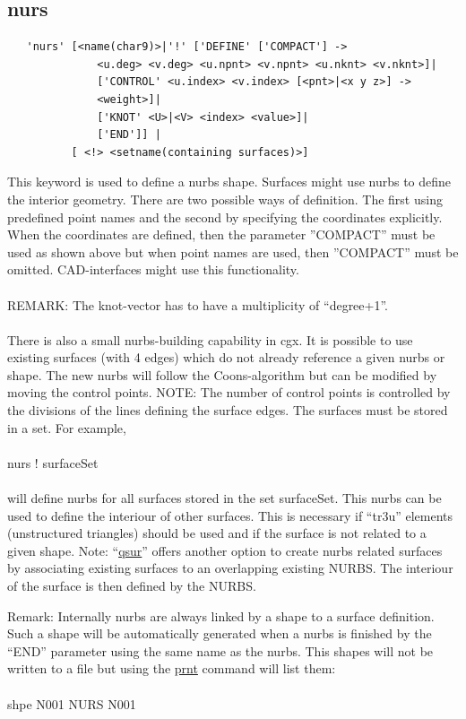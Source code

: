 \documentclass{article}
\providecommand{\htmlref}[2]{\hyperref[#2]{#1}}
\begin{document}
\subsection{\label{nurs}nurs}
\begin{verbatim}
   'nurs' [<name(char9)>|'!' ['DEFINE' ['COMPACT'] ->
              <u.deg> <v.deg> <u.npnt> <v.npnt> <u.nknt> <v.nknt>]|
              ['CONTROL' <u.index> <v.index> [<pnt>|<x y z>] ->
              <weight>]|
              ['KNOT' <U>|<V> <index> <value>]|
              ['END']] |
          [ <!> <setname(containing surfaces)>]
\end{verbatim}
This keyword is used to define a nurbs shape. Surfaces might use nurbs to define the interior geometry. There are two possible ways of definition. The first using predefined point names and the second by specifying the coordinates explicitly. When the coordinates are defined, then the parameter ''COMPACT'' must be used as shown above but when point names are used, then ''COMPACT'' must be omitted. CAD-interfaces might use this functionality.\\\\REMARK: The knot-vector has to have a multiplicity of ``degree+1''.\\\\
There is also a small nurbs-building capability in cgx. It is possible to use
existing surfaces (with 4 edges) which do not already reference a given
nurbs or shape. The new nurbs will follow the Coons-algorithm but can be modified by
moving the control points. NOTE: The number of control points is controlled by the
divisions of the lines defining the surface edges. The surfaces must be stored in a set. For
example,\\\\nurs ! surfaceSet\\\\will define nurbs for all surfaces stored in
the set surfaceSet. This nurbs can be used to define the interiour of other
surfaces. This is necessary if ``tr3u'' elements (unstructured triangles)
should be used and if the surface is not related to a given shape. Note:
``\htmlref{qsur}{qsur}'' offers another option to create nurbs related
surfaces by associating existing surfaces to an overlapping existing
NURBS. The interiour of the surface is then defined by the NURBS.

Remark: Internally nurbs are always linked by a shape to a surface definition. Such a shape will be automatically generated when a nurbs is finished by the ``END'' parameter using the same name as the nurbs. This shapes will not be written to a file but using the \htmlref{prnt}{prnt} command will list them:\\\\shpe N001 NURS N001
\end{document}

